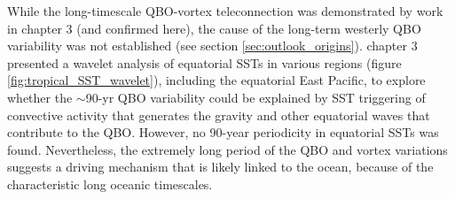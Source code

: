 While the long-timescale QBO-vortex teleconnection was demonstrated by work in chapter 3 (and confirmed here), the cause of the long-term westerly QBO variability was not established (see section \ref{sec:outlook_origins}). chapter 3 presented a wavelet analysis of equatorial SSTs in various regions (figure \ref{fig:tropical_SST_wavelet}), including the equatorial East Pacific, to explore whether the $\sim$90-yr QBO variability could be explained by SST triggering of convective activity that generates the gravity and other equatorial waves that contribute to the QBO. However, no 90-year periodicity in equatorial SSTs was found. Nevertheless, the extremely long period of the QBO and vortex variations suggests a driving mechanism that is likely linked to the ocean, because of the characteristic long oceanic timescales.

